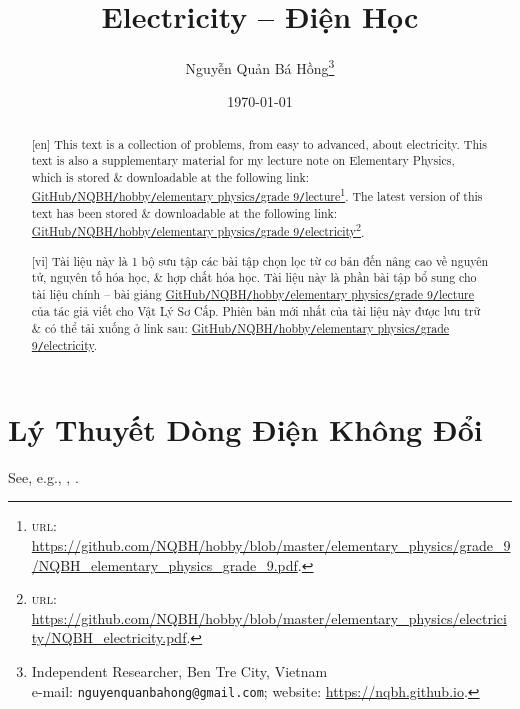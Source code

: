 \documentclass{article}
\title{Electricity -- Điện Học}
\author{Nguyễn Quản Bá Hồng\footnote{Independent Researcher, Ben Tre City, Vietnam\\e-mail: \texttt{nguyenquanbahong@gmail.com}; website: \url{https://nqbh.github.io}.}}
\date{\today}
\begin{document}
\maketitle
\begin{abstract}
	\textsf{[en]} This text is a collection of problems, from easy to advanced, about electricity. This text is also a supplementary material for my lecture note on Elementary Physics, which is stored \& downloadable at the following link: \href{https://github.com/NQBH/hobby/blob/master/elementary_physics/grade_9/NQBH_elementary_physics_grade_9.pdf}{GitHub\texttt{/}NQBH\texttt{/}hobby\texttt{/}elementary physics\texttt{/}grade 9\texttt{/}lecture}\footnote{\textsc{url}: \url{https://github.com/NQBH/hobby/blob/master/elementary_physics/grade_9/NQBH_elementary_physics_grade_9.pdf}.}. The latest version of this text has been stored \& downloadable at the following link:\\\href{https://github.com/NQBH/hobby/blob/master/elementary_physics/electricity/NQBH_electricity.pdf}{GitHub\texttt{/}NQBH\texttt{/}hobby\texttt{/}elementary physics\texttt{/}grade 9\texttt{/}electricity}\footnote{\textsc{url}: \url{https://github.com/NQBH/hobby/blob/master/elementary_physics/electricity/NQBH_electricity.pdf}.}.
	\vspace{2mm}
	
	\textsf{[vi]} Tài liệu này là 1 bộ sưu tập các bài tập chọn lọc từ cơ bản đến nâng cao về nguyên tử, nguyên tố hóa học, \& hợp chất hóa học. Tài liệu này là phần bài tập bổ sung cho tài liệu chính -- bài giảng \href{https://github.com/NQBH/hobby/blob/master/elementary_physics/grade_9/NQBH_elementary_physics_grade_9.pdf}{GitHub\texttt{/}NQBH\texttt{/}hobby\texttt{/}elementary physics\texttt{/}grade 9\texttt{/}lecture} của tác giả viết cho Vật Lý Sơ Cấp. Phiên bản mới nhất của tài liệu này được lưu trữ \& có thể tải xuống ở link sau: \href{https://github.com/NQBH/hobby/blob/master/elementary_physics/grade_9/real/NQBH_real.pdf}{GitHub\texttt{/}NQBH\texttt{/}hobby\texttt{/}elementary physics\texttt{/}grade 9\texttt{/}electricity}.
\end{abstract}
\setcounter{secnumdepth}{4}
\setcounter{tocdepth}{3}
\tableofcontents


\section{Lý Thuyết Dòng Điện Không Đổi}
See, e.g., \cite[Chap. 1]{SGK_Vat_Ly_9}, \cite[Chủ đề I, pp. 5--8]{Hoe_Vat_Ly_9}.
\end{document}
